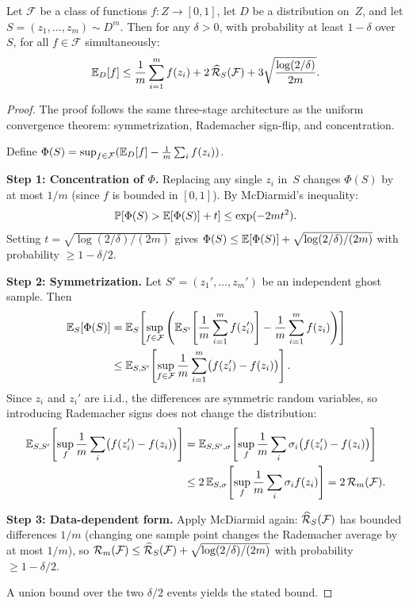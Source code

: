 \begin{thm}
\label{thm:rademacher-bound}
Let $\mathcal{F}$ be a class of functions $f \colon Z \to [0,1]$, let
$D$ be a distribution on~$Z$, and let $S = (z_1,\ldots,z_m) \sim D^m$.
Then for any $\delta > 0$, with probability at least $1-\delta$ over~$S$,
for all $f \in \mathcal{F}$ simultaneously:
\[
  \mathbb{E}_D[f] \leq \frac{1}{m}\sum_{i=1}^m f(z_i)
    + 2\,\widehat{\mathcal{R}}_S(\mathcal{F})
    + 3\sqrt{\frac{\log(2/\delta)}{2m}}.
\]
\end{thm}

\begin{proof}
The proof follows the same three-stage architecture as the uniform
convergence theorem: symmetrization, Rademacher sign-flip, and
concentration.

Define $\Phi(S) = \sup_{f \in \mathcal{F}} (\mathbb{E}_D[f] -
\frac{1}{m}\sum_i f(z_i))$.

\textbf{Step 1: Concentration of $\Phi$.}
Replacing any single $z_i$ in~$S$ changes $\Phi(S)$ by at most $1/m$
(since $f$ is bounded in $[0,1]$).  By McDiarmid's inequality:
\begin{equation}
\label{eq:rad-conc}
  \mathbb{P}[\Phi(S) > \mathbb{E}[\Phi(S)] + t] \leq \exp(-2mt^2).
\end{equation}
Setting $t = \sqrt{\log(2/\delta)/(2m)}$ gives
$\Phi(S) \leq \mathbb{E}[\Phi(S)] + \sqrt{\log(2/\delta)/(2m)}$
with probability $\geq 1 - \delta/2$.

\textbf{Step 2: Symmetrization.}
Let $S' = (z_1', \ldots, z_m')$ be an independent ghost sample.  Then
\begin{align*}
  \mathbb{E}_S[\Phi(S)]
  &= \mathbb{E}_S\!\left[\sup_{f \in \mathcal{F}} \left(\mathbb{E}_{S'}
    \!\left[\frac{1}{m}\sum_{i=1}^m f(z_i')\right]
    - \frac{1}{m}\sum_{i=1}^m f(z_i)\right)\right] \\
  &\leq \mathbb{E}_{S, S'}\!\left[\sup_{f \in \mathcal{F}}
    \frac{1}{m}\sum_{i=1}^m \bigl(f(z_i') - f(z_i)\bigr)\right].
\end{align*}
Since $z_i$ and $z_i'$ are i.i.d., the differences are symmetric
random variables, so introducing Rademacher signs does not change the
distribution:
\begin{align*}
  \mathbb{E}_{S, S'}\!\left[\sup_{f}
    \frac{1}{m}\sum_i \bigl(f(z_i') - f(z_i)\bigr)\right]
  &= \mathbb{E}_{S, S', \sigma}\!\left[\sup_{f}
    \frac{1}{m}\sum_i \sigma_i\bigl(f(z_i') - f(z_i)\bigr)\right] \\
  &\leq 2\,\mathbb{E}_{S, \sigma}\!\left[\sup_{f}
    \frac{1}{m}\sum_i \sigma_i f(z_i)\right]
  = 2\,\mathcal{R}_m(\mathcal{F}).
\end{align*}

\textbf{Step 3: Data-dependent form.}
Apply McDiarmid again: $\widehat{\mathcal{R}}_S(\mathcal{F})$ has bounded differences
$1/m$ (changing one sample point changes the Rademacher average by at
most $1/m$), so
$\mathcal{R}_m(\mathcal{F}) \leq \widehat{\mathcal{R}}_S(\mathcal{F})
  + \sqrt{\log(2/\delta)/(2m)}$
with probability $\geq 1 - \delta/2$.

A union bound over the two $\delta/2$ events yields the stated bound.
\end{proof}


